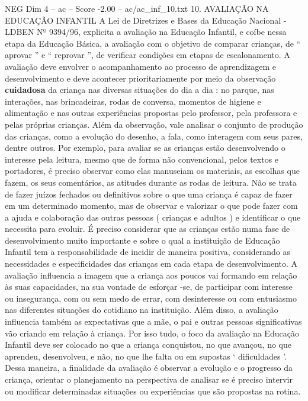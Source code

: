 \begin{textsample}{NEG Dim 4 – ac – Score -2.00 – ac/ac\_inf\_10.txt}  \label{ex:f4_neg_046}
10.
AVALIAÇÃO NA EDUCAÇÃO INFANTIL A Lei de Diretrizes e Bases da Educação Nacional - LDBEN Nº 9394/96, explicita a avaliação na Educação Infantil, e coíbe nessa etapa da Educação Básica, a avaliação com o objetivo de comparar crianças, de “ aprovar ” e “ reprovar ”, de verificar condições em etapas de escalonamento.
A avaliação deve envolver o acompanhamento ao processo de aprendizagem e desenvolvimento e deve acontecer prioritariamente por meio da observação \textbf{cuidadosa} da criança nas diversas situações do dia a dia : no parque, nas interações, nas brincadeiras, rodas de conversa, momentos de higiene e alimentação e nas outras experiências propostas pelo professor, pela professora e pelas próprias crianças.
Além da observação, vale analisar o conjunto de produção das crianças, como a evolução do desenho, a fala, como interagem com seus pares, dentre outros.
Por exemplo, para avaliar se as crianças estão desenvolvendo o interesse pela leitura, mesmo que de forma não convencional, pelos textos e portadores, é preciso observar como elas manuseiam os materiais, as escolhas que fazem, os seus comentários, as atitudes durante as rodas de leitura.
Não se trata de fazer juízos fechados ou definitivos sobre o que uma criança é capaz de fazer em um determinado momento, mas de observar e valorizar o que pode fazer com a ajuda e colaboração das outras pessoas ( crianças e adultos ) e identificar o que necessita para evoluir.
É preciso considerar que as crianças estão numa fase de desenvolvimento muito importante e sobre o qual a instituição de Educação Infantil tem a responsabilidade de incidir de maneira positiva, considerando as necessidades e especificidades das crianças em cada etapa de desenvolvimento.
A avaliação influencia a imagem que a criança aos poucos vai formando em relação às suas capacidades, na sua vontade de esforçar -se, de participar com interesse ou insegurança, com ou sem medo de errar, com desinteresse ou com entusiasmo nas diferentes situações do cotidiano na instituição.
Além disso, a avaliação influencia também as expectativas que a mãe, o pai e outras pessoas significativas vão criando em relação à criança.
Por isso tudo, o foco da avaliação na Educação Infantil deve ser colocado no que a criança conquistou, no que avançou, no que aprendeu, desenvolveu, e não, no que lhe falta ou em supostas ‘ dificuldades ’.
Dessa maneira, a finalidade da avaliação é observar a evolução e o progresso da criança, orientar o planejamento na perspectiva de analisar se é preciso intervir ou modificar determinadas situações ou experiências que são propostas na rotina.

\end{textsample}
